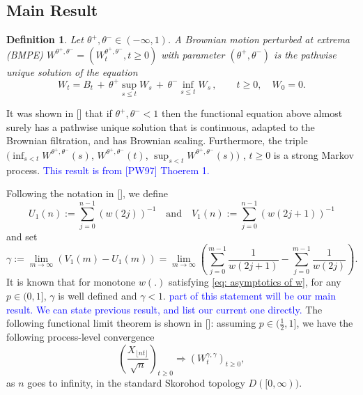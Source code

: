 \documentclass[twoside,12pt,a4paper]{article}
\newtheorem{definition}{Definition}[section]
\numberwithin{equation}{section}
\newcommand{\comment}[1]{\textcolor{blue}{#1}}
\begin{document}
	
	
	
	\subsection{Main Result}
	\begin{definition}
		\label{defn:BMPE}
		Let $\theta^+, \theta^- \in (- \infty , 1)$. A Brownian motion perturbed at
		extrema (BMPE) $W^{\theta^+, \theta^-} = \left(W^{\theta^+, \theta^-}_t, t\geq 0\right)$ with parameter  $(\theta^+, \theta^-)$ is the pathwise unique solution of the equation
		$$
		W_t = B_t \,+\, \theta^+ \sup_{s\leq t} W_s  \,+\, \theta^- \inf_{s\leq t} W_s \,,   \qquad t \ge 0, \quad W_0 = 0.
		$$
	\end{definition}
	It was shown in [\cite{PW97, CD99}] that if $\theta^+, \theta^- < 1$ then the functional equation above almost surely has a pathwise unique solution that is continuous, adapted to the Brownian filtration, and has Brownian scaling. 
	Furthermore, the triple 
	$\big(\inf_{s < t} W^{\theta^{+}, \theta^{-}}(s)$, 
	$W^{\theta^{+}, \theta^{-}}(t) $, 
	$\sup _{s<t} W^{\theta^{+}, \theta^{-}}(s)\big)$
	, $t \geq 0$ is a strong Markov process.
	\comment{This result is from [PW97] Thoerem 1.}
	
	Following the notation in [\cite{T96}], we define
	\[
	U_1(n):=\sum_{j=0}^{n-1}(w(2 j))^{-1} \quad \text{and} \quad
	V_1(n):=\sum_{j=0}^{n-1}(w(2 j+1))^{-1}
	\]
	and set
	\begin{equation}
		\label{eq: gamma}
		\gamma:= \lim_{m\to \infty}\left( V_1(m) - U_1(m) \right) =\lim_{m\to \infty} \left( \sum_{j=0}^{m-1} \frac{1}{ w(2j+1)}-  \sum_{j=0}^{m-1}  \frac{1}{w(2j)} \right) 
		.\end{equation}
	It is known that for monotone $w(.)$ satisfying \eqref{eq: asymptotics of w}, for any $p\in (0,1]$, $\gamma$
	is well defined and ${\gamma<1}$. 
	\comment{part of this statement will be our main result. We can state previous result, and list our current one directly.}
	The following functional limit theorem is shown in [\cite{KMP22}]: assuming $p\in (\frac{1}{2},1]$, we have the following process-level convergence
	\[
	\left(  \frac{X_{\lfloor nt \rfloor }}{\sqrt{n}}  \right)_{t\geq 0} \Longrightarrow \left( W^{\gamma,\gamma}_{t}\right)_{t\geq 0},
	\] 
	as $n$ goes to infinity, in the standard Skorohod topology $D([0,\infty) ).$
	
\end{document}

